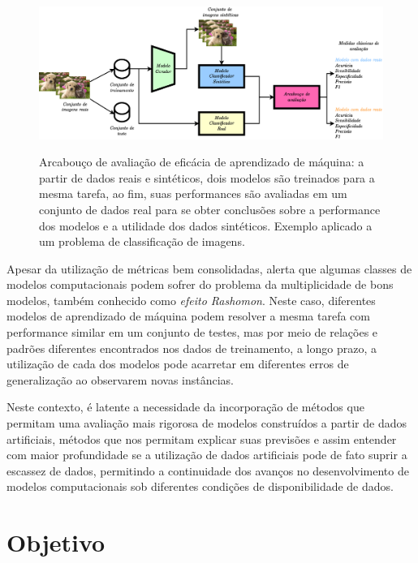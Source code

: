 \begin{figure}[htbp]
	\centering
	\caption[Arcabouço de avaliação de eficácia de aprendizado de máquina]{Arcabouço de avaliação de eficácia de aprendizado de máquina: a partir de dados reais e sintéticos, dois modelos são treinados para a mesma tarefa, ao fim, suas performances são avaliadas em um conjunto de dados real para se obter conclusões sobre a performance dos modelos e a utilidade dos dados sintéticos. Exemplo aplicado a um problema de classificação de imagens. }
		\includegraphics[scale=.25]{imagens/arcabouco-simples.png}
	\label{fig:arcabouco-simples}
\end{figure}

Apesar da utilização de métricas bem consolidadas,  alerta que algumas classes de modelos computacionais podem sofrer do problema da multiplicidade de bons modelos, também conhecido como \textit{efeito Rashomon}. Neste caso, diferentes modelos de aprendizado de máquina podem resolver a mesma tarefa com performance similar em um conjunto de testes, mas por meio de relações e padrões diferentes encontrados nos dados de treinamento, a longo prazo, a utilização de cada dos modelos pode acarretar em diferentes erros de generalização ao observarem novas instâncias.

Neste contexto, é latente a necessidade da incorporação de métodos que permitam uma avaliação mais rigorosa de modelos construídos a partir de dados artificiais, métodos que nos permitam explicar suas previsões e assim entender com maior profundidade se a utilização de dados artificiais pode de fato suprir a escassez de dados, permitindo a continuidade dos avanços no desenvolvimento de modelos computacionais sob diferentes condições de disponibilidade de dados.

\section{Objetivo}

